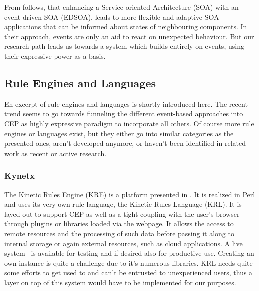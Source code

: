 \documentclass[11pt]{article}%
\begin{document}
From \cite{2010-Ye_Jacobsen-EEWS.pdf} follows, that enhancing a Service oriented Architecture (SOA) with an event-driven SOA (EDSOA), leads to more flexible and adaptive SOA applications that can be informed about states of neighbouring components. In their approach, events are only an aid to react on unexpected behaviour. But our research path leads us towards a system which builds entirely on events, using their expressive power as a basis.

\subsection{Rule Engines and Languages}
En excerpt of rule engines and languages is shortly introduced here. The recent trend seems to go towards funneling the different event-based approaches into CEP as highly expressive paradigm to incorporate all others. Of course more rule engines or languages exist, but they either go into similar categories as the presented ones, aren't developed anymore, or haven't been identified in related work as recent or active research.

\subsubsection{Kynetx}
The Kinetic Rules Engine (KRE) is a platform presented in \cite{bookTheLiveWeb}. It is realized in Perl and uses its very own rule language, the Kinetic Rules Language (KRL). It is layed out to support CEP as well as a tight coupling with the user's browser through plugins or libraries loaded via the webpage. It allows the access to remote resources and the processing of such data before passing it along to internal storage or again external resources, such as cloud applications. A live system~\cite{wwwkynetx} is available for testing and if desired also for productive use. Creating an own instance is quite a challenge due to it's numerous libraries. KRL needs quite some efforts to get used to and can't be entrusted to unexperienced users, thus a layer on top of this system would have to be implemented for our purposes.

\end{document}
